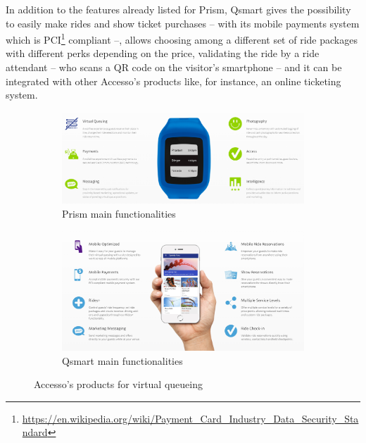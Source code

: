 In addition to the features already listed for Prism, Qsmart gives the possibility to easily make rides and
show ticket purchases -- with its mobile payments system which is
PCI\footnote{\url{https://en.wikipedia.org/wiki/Payment_Card_Industry_Data_Security_Standard}} compliant --,
allows choosing among a different set of ride packages with different perks depending on the price, validating the
ride by a ride attendant -- who scans a QR code on the visitor's smartphone -- and it can be integrated with other Accesso's products like, for instance, an online ticketing system.


\begin{figure}[H]
    \centering
    \begin{subfigure}[b]{0.85\textwidth}
        \centering
        \includegraphics[width=\textwidth]{img/prism}
        \caption{Prism main functionalities}
        \label{fig:prism}
    \end{subfigure}
    \hfill
    \begin{subfigure}[b]{0.85\textwidth}
        \centering
        \includegraphics[width=\textwidth]{img/qsmart}
        \caption{Qsmart main functionalities}
        \label{fig:qsmart}
    \end{subfigure}
    \caption{Accesso's products for virtual queueing\protect\footnotemark}
    \label{fig:prismart}
\end{figure}

